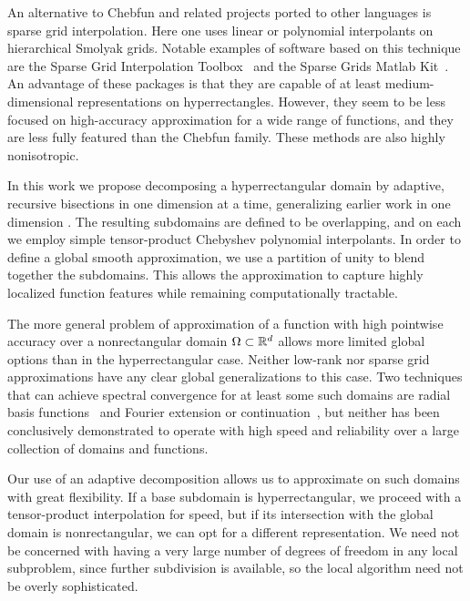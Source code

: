 An alternative to Chebfun and related projects ported to other languages is sparse grid interpolation. Here one uses linear or polynomial interpolants on hierarchical Smolyak grids. Notable examples of software based on this technique are the Sparse Grid Interpolation Toolbox~\cite{Klimke2005} and the Sparse Grids Matlab Kit~\cite{Back2011}. An advantage of these packages is that they are capable of at least medium-dimensional representations on hyperrectangles. However, they seem to be less focused on high-accuracy approximation for a wide range of functions, and they are less fully featured than the Chebfun family. These methods are also highly nonisotropic.

In this work we propose decomposing a hyperrectangular domain by adaptive, recursive bisections in one dimension at a time, generalizing earlier work in one dimension \cite{Aiton2018}. The resulting subdomains are defined to be overlapping, and on each we employ simple tensor-product Chebyshev polynomial interpolants. In order to define a global smooth approximation, we use a partition of unity to blend together the subdomains. This allows the approximation to capture highly localized function features while remaining computationally tractable.

The more general problem of approximation of a function with high pointwise accuracy over a nonrectangular domain $\Omega \subset \mathbb{R}^d$ allows more limited global options than in the hyperrectangular case. Neither low-rank nor sparse grid approximations have any clear global generalizations to this case. Two techniques that can achieve spectral convergence for at least some such domains are radial basis functions~\cite{Fornberg2015} and Fourier extension or continuation~\cite{adcock2014resolution}, but neither has been conclusively demonstrated to operate with high speed and reliability over a large collection of domains and functions.

Our use of an adaptive decomposition allows us to approximate on such domains with great flexibility. If a base subdomain is hyperrectangular, we proceed with a tensor-product interpolation for speed, but if its intersection with the global domain is nonrectangular, we can opt for a different representation. We need not be concerned with having a very large number of degrees of freedom in any local subproblem, since further subdivision is available, so the local algorithm need not be overly sophisticated. 


